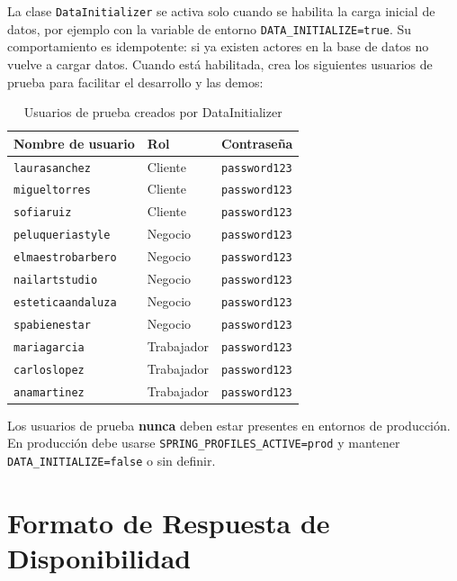 \documentclass[12pt,a4paper,twoside]{report}
\begin{document}
La clase \texttt{DataInitializer} se activa solo cuando se habilita la carga inicial de datos, por ejemplo con la variable de entorno \texttt{DATA\_INITIALIZE=true}. Su comportamiento es idempotente: si ya existen actores en la base de datos no vuelve a cargar datos. Cuando está habilitada, crea los siguientes usuarios de prueba para facilitar el desarrollo y las demos:

\begin{table}[H]
\centering
\caption{Usuarios de prueba creados por DataInitializer}
\label{tab:usuarios-prueba}
\begin{tabular}{lll}
\toprule
Nombre de usuario & Rol & Contraseña \\
\midrule
\texttt{laurasanchez} & Cliente & \texttt{password123} \\
\texttt{migueltorres} & Cliente & \texttt{password123} \\
\texttt{sofiaruiz} & Cliente & \texttt{password123} \\
\texttt{peluqueriastyle} & Negocio & \texttt{password123} \\
\texttt{elmaestrobarbero} & Negocio & \texttt{password123} \\
\texttt{nailartstudio} & Negocio & \texttt{password123} \\
\texttt{esteticaandaluza} & Negocio & \texttt{password123} \\
\texttt{spabienestar} & Negocio & \texttt{password123} \\
\texttt{mariagarcia} & Trabajador & \texttt{password123} \\
\texttt{carloslopez} & Trabajador & \texttt{password123} \\
\texttt{anamartinez} & Trabajador & \texttt{password123} \\
\bottomrule
\end{tabular}
\end{table}

\begin{tcolorbox}[advertenciaStyle]
Los usuarios de prueba \textbf{nunca} deben estar presentes en entornos de producción. En producción debe usarse \texttt{SPRING\_PROFILES\_ACTIVE=prod} y mantener \texttt{DATA\_INITIALIZE=false} o sin definir.
\end{tcolorbox}

\chapter{Formato de Respuesta de Disponibilidad}
\end{document}
